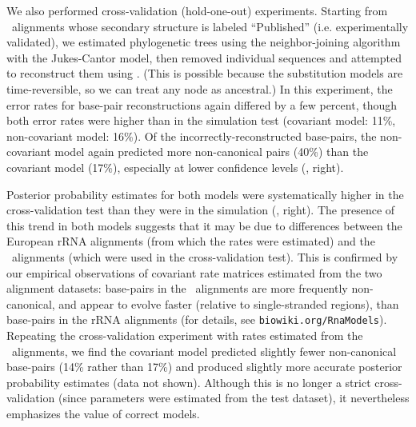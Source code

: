 \documentclass[10pt]{article}
\begin{document}
We also performed cross-validation (hold-one-out) experiments. Starting from \RFAM\ alignments whose secondary structure is labeled ``Published'' (i.e. experimentally validated),
we estimated phylogenetic trees using the neighbor-joining algorithm
with the Jukes-Cantor model,
then removed individual sequences
 and attempted to reconstruct them using \xrate.
(This is possible because the substitution models are time-reversible, so we can treat any node as ancestral.)
In this experiment, the error rates for base-pair reconstructions again differed by a few percent, though both error rates were higher than in the simulation test
(covariant model: 11\%, non-covariant model: 16\%).
Of the incorrectly-reconstructed base-pairs, the non-covariant model again predicted more non-canonical pairs (40\%) than the covariant model (17\%),
especially at lower confidence levels (, right).

Posterior probability estimates for both models were
systematically higher in the cross-validation test than they were in the simulation (, right).
The presence of this trend in both models
suggests that it may be due to differences between the European rRNA alignments
(from which the rates were estimated)
and the \RFAM\ alignments (which were used in the cross-validation test).
This is confirmed by our empirical observations of
covariant rate matrices estimated from the two alignment datasets:
base-pairs in the \RFAM\ alignments are more frequently
non-canonical, and appear to evolve faster (relative to single-stranded regions),
than base-pairs in the rRNA alignments
(for details, see {\tt biowiki.org/RnaModels}).
Repeating the cross-validation experiment with rates estimated from the \RFAM\ alignments,
we find the covariant model predicted slightly fewer non-canonical base-pairs
(14\% rather than 17\%)
and produced slightly more accurate posterior probability estimates (data not shown).
Although this is no longer a strict cross-validation (since parameters were estimated from the test dataset),
it nevertheless emphasizes the value of correct models.
\end{document}
